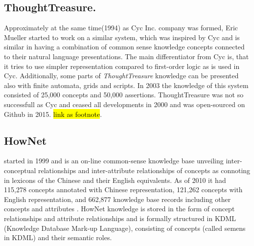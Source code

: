 \subsection{ThoughtTreasure.} Approximately at the same time(1994) as Cyc Inc. 
company was formed, Eric Mueller started to work on a similar system, which was
inspired by Cyc and is similar in having a combination of common sense knowledge
concepts connected to their natural language presentations. The main 
differentiator from Cyc is, that it tries to use simpler representation compared
to first-order logic as is used in Cyc. Additionally, some parts of 
\emph{ThoughtTreasure} knowledge can be presented also with finite automata, 
grids and scripts\parencite{Mueller1999,Mueller2003}. In 2003 the knowledge of
this system consisted of 25,000 concepts and 50,000 assertions. ThoughtTreasure 
was not so successfull as Cyc and ceased all developments in 2000 and was 
open-sourced on Github in 2015. \hl{link as footnote}.

\subsection{HowNet} started in 1999 and is an on-line common-sense knowledge base 
unveiling inter-conceptual relationships and inter-attribute relationships of 
concepts as connoting in lexicons of the Chinese and their English equivalents. 
As of 2010 it had 115,278 concepts annotated with Chinese representation, 
121,262 concepts with English representation, and 662,877 knowledge base records
including other concepts and attributes \parencite{Dong2010}. HowNet knowledge 
is stored in the form of concept relationships and attribute relationships and 
is formally structured in KDML (Knowledge Database Mark-up Language), consisting
of concepts (called semens in KDML) and their semantic roles.
 
